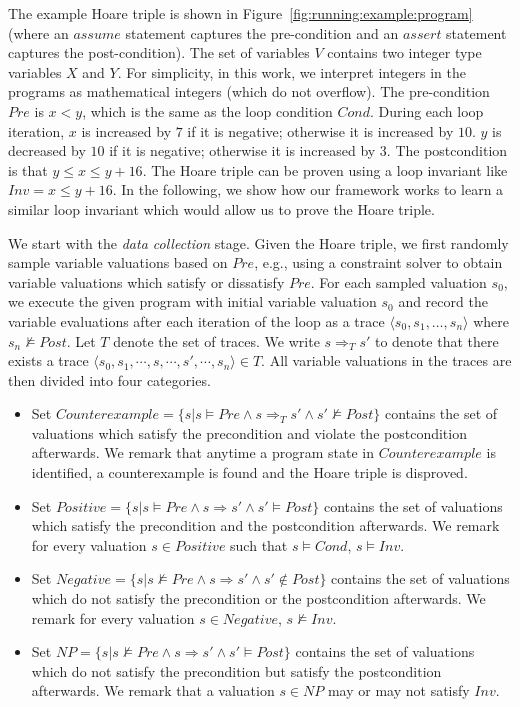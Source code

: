 \begin{example}
 The example Hoare triple is shown in Figure~\ref{fig:running:example:program} (where an $assume$ statement captures the pre-condition and an $assert$ statement captures the post-condition). The set of variables $V$ contains two integer type variables $X$ and $Y$. For simplicity, in this work, we interpret integers in the programs as mathematical integers (which do not overflow). The pre-condition $Pre$ is $x < y$, which is the same as the loop condition $Cond$.
During each loop iteration, $x$ is increased by $7$ if it is negative; otherwise it is increased by $10$. $y$ is decreased by $10$ if it is negative; otherwise it is increased by $3$. The postcondition is that $y \le x \le y + 16$.
The Hoare triple can be proven using a loop invariant like $Inv = x \le y + 16$. In the following, we show how our framework works to learn a similar loop invariant which would allow us to prove the Hoare triple.
\end{example}
We start with the \emph{data collection} stage. Given the Hoare triple, we first randomly sample variable valuations based on $\mathit{Pre}$, e.g., using a constraint solver to obtain variable valuations which satisfy or dissatisfy $\mathit{Pre}$. For each sampled valuation $s_0$, we execute the given program with initial variable valuation $s_0$ and record the variable evaluations after each iteration of the loop as a trace $\langle s_0, s_1, \ldots, s_n \rangle$ where $s_n \not \models \mathit{Post}$. Let $T$ denote the set of traces. We write $s \Rightarrow_T s'$ to denote that there exists a trace $\langle s_0, s_1, \cdots, s, \cdots, s', \cdots, s_n \rangle \in T$.
All variable valuations in the traces are then divided into four categories.
\begin{itemize}
    \item Set $Counterexample = \{s | s \models Pre \land s \Rightarrow_T s' \land s' \not \models Post\}$ contains the set of valuations which satisfy the precondition and violate the postcondition afterwards. We remark that anytime a program state in $Counterexample$ is identified, a counterexample is found and the Hoare triple is disproved.
    \item Set $Positive = \{s | s \models Pre \land s \Rightarrow s' \land s' \models Post\}$ contains the set of valuations which satisfy the precondition and the postcondition afterwards. We remark for every valuation $s \in Positive$ such that $s \models Cond$, $s \models Inv$.
    \item Set $Negative = \{s | s \not \models Pre \land s \Rightarrow s' \land s' \not \in Post\}$ contains the set of valuations which do not satisfy the precondition or the postcondition afterwards. We remark for every valuation $s \in Negative$, $s \not \models Inv$.
    \item Set $NP = \{s | s \not \models Pre \land s \Rightarrow s' \land s' \models Post\}$ contains the set of valuations which do not satisfy the precondition but satisfy the postcondition afterwards. We remark that a valuation $s \in NP$ may or may not satisfy $Inv$.
\end{itemize}
